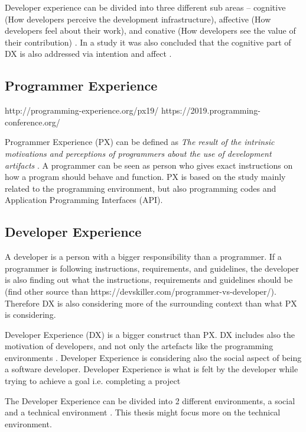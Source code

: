 \documentclass[english, 12pt, a4paper, sci, utf8, a-1b, online]{aaltothesis}
\begin{document}
Developer experience can be divided into three different sub areas – cognitive (How developers perceive the development infrastructure), affective (How developers feel about their work), and conative (How developers see the value of their contribution) \cite{fagerholm-dx-concept-and-definition}. In a study it was also concluded that the cognitive part of DX is also addressed via intention and affect \cite{kuusinen-flow}.

\subsection{Programmer Experience}

{
  \color{gray} http://programming-experience.org/px19/ https://2019.programming-conference.org/
}

Programmer Experience (PX) can be defined as \textit{The result of the intrinsic motivations and perceptions of programmers about the use of development artifacts} \cite{programmer-experience}. A programmer can be seen as person who gives exact instructions on how a program should behave and function. PX is based on the study mainly related to the programming environment, but also programming codes and Application Programming Interfaces (API).

\subsection{Developer Experience}

A developer is a person with a bigger responsibility than a programmer. If a programmer is following instructions, requirements, and guidelines, the developer is also finding out what the instructions, requirements and guidelines should be {\color{gray} (find other source than https://devskiller.com/programmer-vs-developer/).} Therefore DX is also considering more of the surrounding context than what PX is considering.

Developer Experience (DX) is a bigger construct than PX. DX includes also the motivation of developers, and not only the artefacts like the programming environments \cite{programmer-experience}. Developer Experience is considering also the social aspect of being a software developer. Developer Experience is what is felt by the developer while trying to achieve a goal i.e. completing a project

The Developer Experience can be divided into 2 different environments, a social and a technical environment \cite{fagerholm-doctoral-thesis}. This thesis might focus more on the technical environment.
\end{document}
